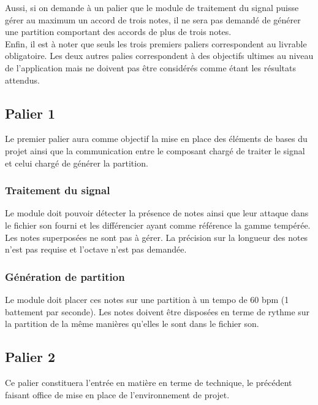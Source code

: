 \documentclass[12pt]{article}
\begin{document}
Aussi, si on demande à un palier que le module de traitement du signal puisse gérer au maximum un accord de trois notes, il ne sera pas demandé de générer une partition comportant des accords de plus de trois notes.\\

Enfin, il est à noter que seuls les trois premiers paliers correspondent au livrable obligatoire. Les deux autres palies correspondent à des objectifs ultimes au niveau de l'application mais ne doivent pas être considérés comme étant les résultats attendus.

\newpage
\subsection{Palier 1}

Le premier palier aura comme objectif la mise en place des éléments de bases du projet ainsi que la communication entre le composant chargé de traiter le signal et celui chargé de générer la partition.\\

\subsubsection{Traitement du signal}

Le module doit pouvoir détecter la présence de notes ainsi que leur attaque dans le fichier son fourni et les différencier ayant comme référence la gamme tempérée. Les notes superposées ne sont pas à gérer. La précision sur la longueur des notes n'est pas requise et l’octave n’est pas demandée.

\subsubsection{Génération de partition}

Le module doit placer ces notes sur une partition à un tempo de 60 bpm (1 battement par seconde). Les notes doivent être disposées en terme de rythme sur la partition de la même manières qu'elles le sont dans le fichier son.

\newpage
\subsection{Palier 2}

Ce palier constituera l’entrée en matière en terme de technique, le précédent faisant office de mise en place de l’environnement de projet. \\
\end{document}
